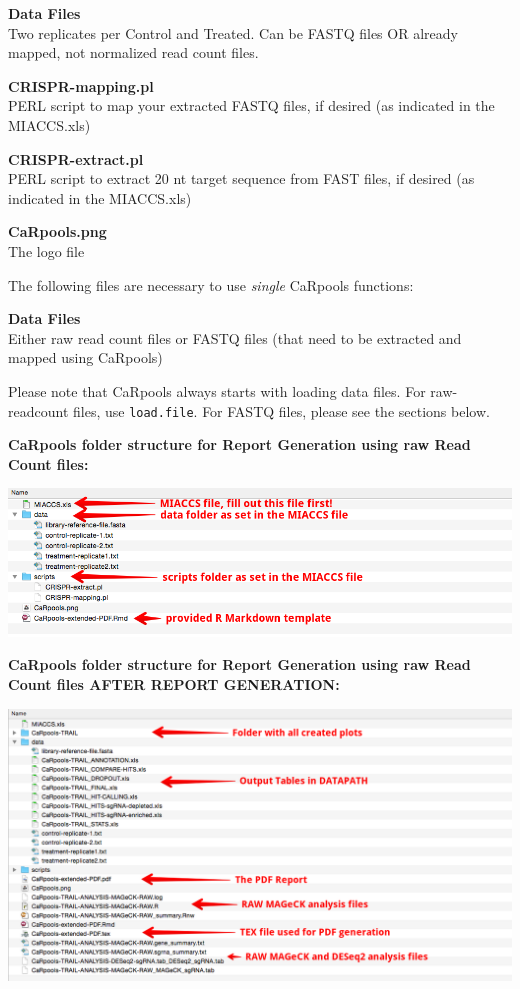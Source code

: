 \documentclass[]{article}
\begin{document}
\textbf{Data Files}\\
Two replicates per Control and Treated. Can be FASTQ files OR already
mapped, not normalized read count files.

\textbf{CRISPR-mapping.pl}\\
PERL script to map your extracted FASTQ files, if desired (as indicated
in the MIACCS.xls)

\textbf{CRISPR-extract.pl}\\
PERL script to extract 20 nt target sequence from FAST files, if desired
(as indicated in the MIACCS.xls)

\textbf{CaRpools.png}\\
The logo file

The following files are necessary to use \emph{single} CaRpools
functions:

\textbf{Data Files}\\
Either raw read count files or FASTQ files (that need to be extracted
and mapped using CaRpools)

Please note that CaRpools always starts with loading data files. For
raw-readcount files, use \texttt{load.file}. For FASTQ files, please see
the sections below.

\newpage

\textbf{CaRpools folder structure for Report Generation using raw Read
Count files:}

\includegraphics{./pictures/folder-structure-before.png}

\newpage

\textbf{CaRpools folder structure for Report Generation using raw Read
Count files AFTER REPORT GENERATION:}

\includegraphics{./pictures/folder-structure-FINAL.png}
\end{document}
